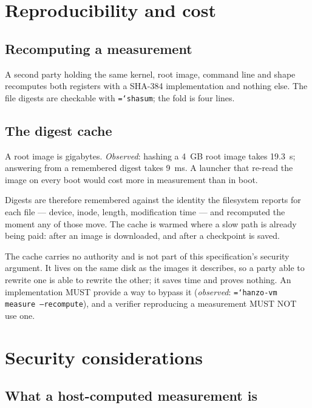 \documentclass[11pt,a4paper]{article}
\newcommand{\code}[1]{\texttt{\hyphenchar\font=`\-\relax #1}}
\begin{document}
\section{Reproducibility and cost}
\label{sec:cost}

\subsection{Recomputing a measurement}

A second party holding the same kernel, root image, command line and shape
recomputes both registers with a SHA-384 implementation and nothing else. The
file digests are checkable with \code{shasum}; the fold is four lines.

\subsection{The digest cache}

A root image is gigabytes. \emph{Observed}: hashing a 4~GB root image takes
19.3~s; answering from a remembered digest takes 9~ms. A launcher that re-read the
image on every boot would cost more in measurement than in boot.

Digests are therefore remembered against the identity the filesystem reports for
each file --- device, inode, length, modification time --- and recomputed the
moment any of those move. The cache is warmed where a slow path is already being
paid: after an image is downloaded, and after a checkpoint is saved.

The cache carries no authority and is not part of this specification's security
argument. It lives on the same disk as the images it describes, so a party able to
rewrite one is able to rewrite the other; it saves time and proves nothing. An
implementation MUST provide a way to bypass it (\emph{observed}:
\code{hanzo-vm measure --recompute}), and a verifier reproducing a measurement
MUST NOT use one.

\section{Security considerations}
\label{sec:security}

\subsection{What a host-computed measurement is}
\end{document}
